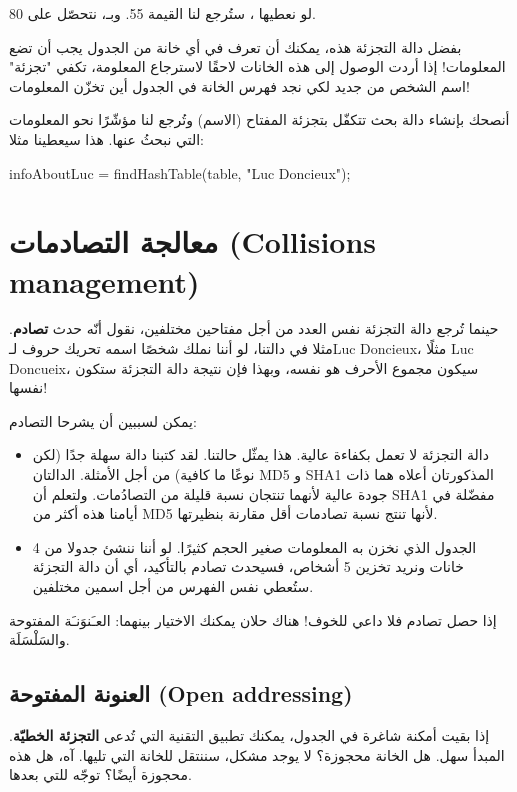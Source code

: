 لو نعطيها
،
ستُرجع لنا القيمة 55. وبـ،
نتحصّل على 80.

بفضل دالة التجزئة هذه، يمكنك أن تعرف في أي خانة من الجدول يجب أن تضع المعلومات! إذا أردت الوصول إلى هذه الخانات لاحقًا لاسترجاع المعلومة، تكفي "تجزئة" اسم الشخص من جديد لكي نجد فهرس الخانة في الجدول أين تخزّن المعلومات!

أنصحك بإنشاء دالة بحث تتكفّل بتجزئة المفتاح (الاسم) وتُرجع لنا مؤشّرًا نحو المعلومات التي نبحثُ عنها. هذا سيعطينا مثلا:

\begin{Csource}
infoAboutLuc = findHashTable(table, "Luc Doncieux");
\end{Csource}

\section{معالجة التصادمات (\textenglish{Collisions management})}

حينما تُرجع دالة التجزئة نفس العدد من أجل مفتاحين مختلفين، نقول أنّه حدث 
\textbf{تصادم}.
مثلا في دالتنا، لو أننا نملك شخصًا اسمه تحريك حروف لـ\textenglish{Luc Doncieux}،
مثلًا
\textenglish{Luc Doncueix}،
سيكون مجموع الأحرف هو نفسه، وبهذا فإن نتيجة دالة التجزئة ستكون نفسها!

يمكن لسببين أن يشرحا التصادم:

\begin{itemize}
	\item دالة التجزئة لا تعمل بكفاءة عالية. هذا يمثّل حالتنا. لقد كتبنا دالة سهلة جدًا (لكن نوعًا ما كافية) من أجل الأمثلة. الدالتان 
	\textenglish{MD5}
	و
	\textenglish{SHA1}
	المذكورتان أعلاه هما ذات جودة عالية لأنهما تنتجان نسبة قليلة من التصادُمات. ولتعلم أن 
	\textenglish{SHA1}
	مفضّلة في أيامنا هذه أكثر من
	\textenglish{MD5}
	لأنها تنتج نسبة تصادمات أقل مقارنة بنظيرتها.
	
	\item الجدول الذي نخزن به المعلومات صغير الحجم كثيرًا. لو أننا ننشئ جدولا من 4 خانات ونريد تخزين 5 أشخاص، فسيحدث تصادم بالتأكيد، أي أن دالة التجزئة ستُعطي نفس الفهرس من أجل اسمين مختلفين.
\end{itemize}

إذا حصل تصادم فلا داعي للخوف! هناك حلان يمكنك الاختيار بينهما: العـَنوَنـَة المفتوحة والسَلْسَلَة.


\subsection{العنونة المفتوحة (\textenglish{Open addressing})}
إذا بقيت أمكنة شاغرة في الجدول، يمكنك تطبيق التقنية التي تُدعى 
\textbf{التجزئة الخطيّة}.
المبدأ سهل. هل الخانة محجوزة؟ لا يوجد مشكل، سننتقل للخانة التي تليها. آه، هل هذه محجوزة أيضًا؟ توجّه للتي بعدها.

